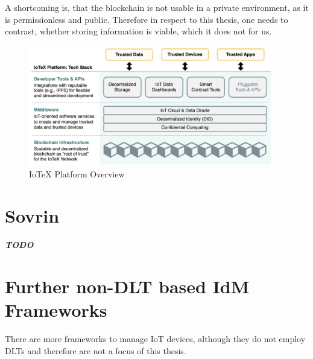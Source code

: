 A shortcoming is, that the blockchain is not usable in a private environment, as it is permissionless and public.
Therefore in respect to this thesis, one needs to contrast, whether storing information is viable, which it does not for
us.

\begin{figure}
	\begin{center}
		\includegraphics[width=0.95\textwidth]{figures/iotex-platform-stack.png}
	\end{center}
	\caption{IoTeX Platform Overview}
	\label{fig:iotex-platform-stack}
\end{figure}

\section{Sovrin} %
\label{sec:Sovrin}
\textbf{\textit{TODO}}

\section{Further non-DLT based IdM Frameworks} %
\label{sec:Further non-DLT based IdM Frameworks}
There are more frameworks to manage IoT devices, although they do not employ DLTs and therefore are not a focus of this
thesis.


